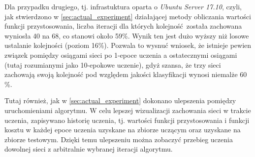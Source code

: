 Dla przypadku drugiego, tj. infrastuktura oparta o \textit{Ubuntu Server 17.10}, czyli, jak stwierdzono w \ref{sec:actual_experiment} działającej metody obliczania wartości funkcji przystosowania, liczba iteracji dla których kolejność została zachowana wyniosła 40 na 68, co stanowi około 59\%.
Wynik ten jest dużo wyższy niż losowe ustalanie kolejności (poziom 16\%).
Pozwala to wysnuć wniosek, że istnieje pewien związek pomiędzy osiągami sieci po 1-epoce uczenia a ostatecznymi osiągami (tutaj rozumianymi jako 10-epokowe uczenie), gdyż szansa, że trzy sieci zachowają swoją kolejność pod względem jakości klasyfikacji wynosi niemalże 60 \%.

Tutaj również, jak w \ref{sec:actual_experiment} dokonano ulepszenia pomiędzy uruchomieniami algorytmu.
W celu lepszej wizualizacji zachowania sieci w trakcie uczenia, zapisywano historię uczenia, tj. wartości funkcji przystosowania i funkcji kosztu w każdej epoce uczenia uzyskane na zbiorze uczącym oraz uzyskane na zbiorze testowym.
Dzięki temu ulepszeniu można zobaczyć przebieg uczenia dowolnej sieci z arbitralnie wybranej iteracji algorytmu.

